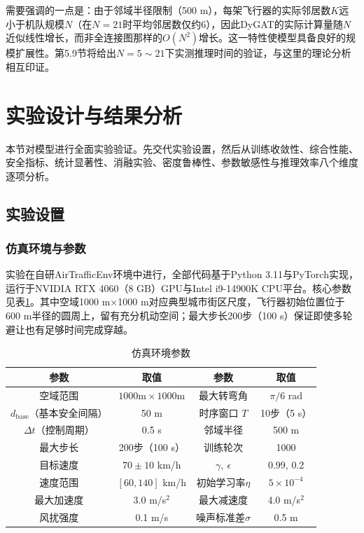 \documentclass[12pt,a4paper,UTF8]{ctexart}
\begin{document}
需要强调的一点是：由于邻域半径限制（500 m），每架飞行器的实际邻居数$K$远小于机队规模$N$（在$N=21$时平均邻居数仅约6），因此DyGAT的实际计算量随$N$近似线性增长，而非全连接图那样的$O(N^2)$增长。这一特性使模型具备良好的规模扩展性。第5.9节将给出$N=5\sim21$下实测推理时间的验证，与这里的理论分析相互印证。

\section{实验设计与结果分析}

本节对模型进行全面实验验证。先交代实验设置，然后从训练收敛性、综合性能、安全指标、统计显著性、消融实验、密度鲁棒性、参数敏感性与推理效率八个维度逐项分析。

\subsection{实验设置}

\subsubsection{仿真环境与参数}

实验在自研AirTrafficEnv环境中进行，全部代码基于Python 3.11与PyTorch实现，运行于NVIDIA RTX 4060（8 GB）GPU与Intel i9-14900K CPU平台。核心参数见表\ref{tab:env}。其中空域1000 m×1000 m对应典型城市街区尺度，飞行器初始位置位于600 m半径的圆周上，留有充分机动空间；最大步长200步（100 s）保证即使多轮避让也有足够时间完成穿越。

\begin{table}[H]
    \centering\small
    \caption{仿真环境参数}
    \label{tab:env}
    \begin{tabular}{|c|c|c|c|}
        \hline
        \textbf{参数} & \textbf{取值} & \textbf{参数} & \textbf{取值} \\
        \hline
        空域范围 & $1000\text{m}\times1000\text{m}$ & 最大转弯角 & $\pi/6$ rad \\
        $d_{\text{base}}$（基本安全间隔） & 50 m & 时序窗口 $T$ & 10步（5 s） \\
        $\Delta t$（控制周期） & 0.5 s & 邻域半径 & 500 m \\
        最大步长 & 200步（100 s） & 训练轮次 & 1000 \\
        目标速度 & $70\pm10$ km/h & $\gamma,\ \epsilon$ & 0.99, 0.2 \\
        速度范围 & $[60, 140]$ km/h & 初始学习率$\eta$ & $5\times10^{-4}$ \\
        最大加速度 & 3.0 m/s$^2$ & 最大减速度 & 4.0 m/s$^2$ \\
        风扰强度 & 0.1 m/s & 噪声标准差$\sigma$ & 0.5 m \\
        \hline
    \end{tabular}
\end{table}
\end{document}
